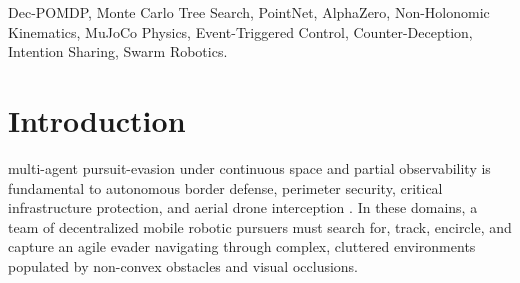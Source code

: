 \documentclass[conference]{IEEEtran}
\begin{document}
\begin{IEEEkeywords}
Dec-POMDP, Monte Carlo Tree Search, PointNet, AlphaZero, Non-Holonomic Kinematics, MuJoCo Physics, Event-Triggered Control, Counter-Deception, Intention Sharing, Swarm Robotics.
\end{IEEEkeywords}

\section{Introduction}
 multi-agent pursuit-evasion under continuous space and partial observability is fundamental to autonomous border defense, perimeter security, critical infrastructure protection, and aerial drone interception \cite{aleksandrov2021pursuit}. In these domains, a team of decentralized mobile robotic pursuers must search for, track, encircle, and capture an agile evader navigating through complex, cluttered environments populated by non-convex obstacles and visual occlusions.
\end{document}
